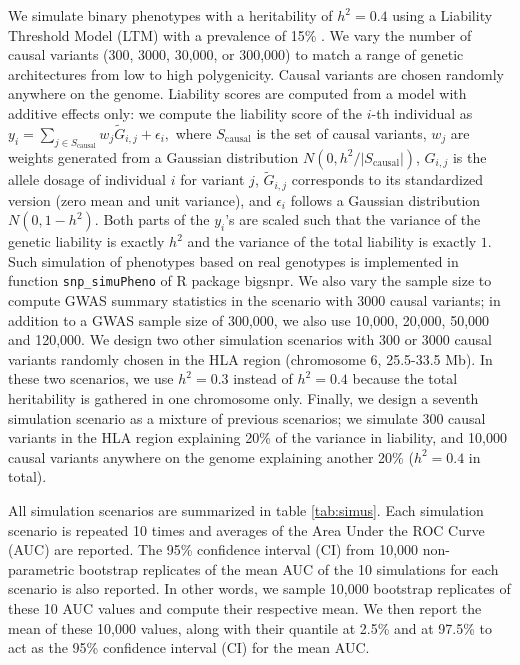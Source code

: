 \documentclass{bioinfo}
\begin{document}
\begin{methods}
We simulate binary phenotypes with a heritability of $h^2=0.4$ using a Liability Threshold Model (LTM) with a prevalence of 15\% \cite[]{falconer1965inheritance}. 
We vary the number of causal variants (300, 3000, 30,000, or 300,000) to match a range of genetic architectures from low to high polygenicity.
Causal variants are chosen randomly anywhere on the genome. 
Liability scores are computed from a model with additive effects only: we compute the liability score of the $i$-th individual as \(y_i = \sum_{j\in S_\text{causal}} w_j \widetilde{G}_{i,j} + \epsilon_i,\) where $S_\text{causal}$ is the set of causal variants, $w_j$ are weights generated from a Gaussian distribution $N(0, h^2 / \vert S_\text{causal} \vert)$, $G_{i,j}$ is the allele dosage of individual $i$ for variant $j$, $\widetilde{G}_{i,j}$ corresponds to its standardized version (zero mean and unit variance), and $\epsilon_i$ follows a Gaussian distribution $N(0, 1 - h^2)$.
Both parts of the $y_i$'s are scaled such that the variance of the genetic liability is exactly $h^2$ and the variance of the total liability is exactly $1$. 
Such simulation of phenotypes based on real genotypes is implemented in function \texttt{snp\_simuPheno} of R package bigsnpr.
We also vary the sample size to compute GWAS summary statistics in the scenario with 3000 causal variants; in addition to a GWAS sample size of 300,000, we also use 10,000, 20,000, 50,000 and 120,000. 
We design two other simulation scenarios with 300 or 3000 causal variants randomly chosen in the HLA region (chromosome 6, 25.5-33.5 Mb). In these two scenarios, we use $h^2=0.3$ instead of $h^2=0.4$ because the total heritability is gathered in one chromosome only.
Finally, we design a seventh simulation scenario as a mixture of previous scenarios; we simulate 300 causal variants in the HLA region explaining 20\% of the variance in liability, and 10,000 causal variants anywhere on the genome explaining another 20\% ($h^2 = 0.4$ in total).

All simulation scenarios are summarized in table \ref{tab:simus}.
Each simulation scenario is repeated 10 times and averages of the Area Under the ROC Curve (AUC) are reported. The 95\% confidence interval (CI) from 10,000 non-parametric bootstrap replicates of the mean AUC of the 10 simulations for each scenario is also reported. 
In other words, we sample 10,000 bootstrap replicates of these 10 AUC values and compute their respective mean. 
We then report the mean of these 10,000 values, along with their quantile at 2.5\% and at 97.5\% to act as the 95\% confidence interval (CI) for the mean AUC.


\end{methods}
\end{document}
